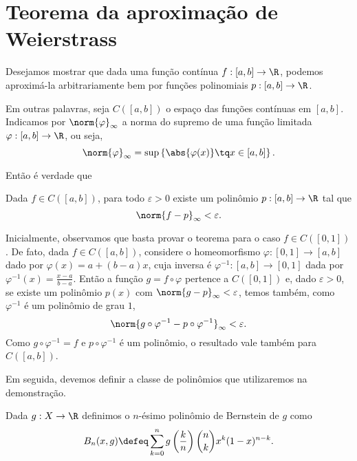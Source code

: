 
\section{Teorema da aproximação de Weierstrass}

Desejamos mostrar que dada uma função contínua \( f : [a, b] \to \R \), podemos aproximá-la arbitrariamente bem por funções polinomiais \( p : [a, b] \to \R \).

Em outras palavras, seja \( C( [a, b]) \) o espaço das funções contínuas em \( [a, b] \). Indicamos por \( \norm{ \varphi }_{ \infty } \) a norma do supremo de uma função limitada \( \varphi : [a, b] \to \R \), ou seja, \[
    \norm{ \varphi }_{ \infty } = \sup \left\{ \abs{ \varphi(x) } \tq x \in [a, b] \right\}
.\]

Então é verdade que

\begin{teo}
    \label{thm: weierstrass}
    Dada \( f \in C( [a, b] ) \), para todo \( \varepsilon > 0 \) existe um polinômio \( p : [a, b] \to \R \) tal que \[
        \norm{ f - p }_{ \infty } < \varepsilon
    .\]
\end{teo}

Inicialmente, observamos que basta provar o teorema para o caso \( f \in C([0, 1]) \).
De fato, dada \( f \in C([a, b]) \), considere o homeomorfismo \( \varphi : [0, 1] \to [a, b] \) dado por \( \varphi(x) = a + ( b - a )x \), cuja inversa é \( \varphi^{ -1 } : [a, b] \to [0, 1] \) dada por \( \varphi^{ -1 } (x) = \frac{ x - a }{ b - a } \).
Então a função \( g = f \circ \varphi \) pertence a \( C([0, 1]) \) e, dado \( \varepsilon > 0 \), se existe um polinômio \( p(x) \) com \( \norm{ g - p }_{ \infty } < \varepsilon \), temos também, como \( \varphi^{ -1 } \) é um polinômio de grau \( 1 \), \[
    \norm{ g \circ \varphi^{ -1 } - p \circ \varphi^{ -1 } }_{ \infty } < \varepsilon
.\]
Como \( g \circ \varphi^{ -1 } = f \) e \( p \circ \varphi^{ -1 } \) é um polinômio, o resultado vale também para \( C([a, b]) \).

Em seguida, devemos definir a classe de polinômios que utilizaremos na demonstração.

\begin{defn}
    \label{def: bernstein}
    Dada \( g : X \to \R \) definimos o \( n \)-ésimo polinômio de Bernstein de \( g \) como
    \begin{equation}
        B_{ n }(x, g) \defeq
        \sum_{ k=0 }^{ n } g \left( \frac{ k }{ n } \right) \binom{n}{k} x^{ k } ( 1 - x )^{ n - k }
        \label{eq: bernstein}
    .\end{equation}
\end{defn}

